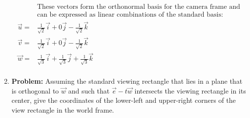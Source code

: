 \documentclass[a4paper, 12pt]{article}
\begin{document}
\begin{enumerate}
\begin{align*}
        &\text{These vectors form the orthonormal basis for the camera frame and}\\
        &\text{can be expressed as linear combinations of the standard basis:}\\
        \vec{u} =& \frac{1}{\sqrt{2}}\vec{i} + 0\vec{j} -\frac{1}{\sqrt{2}}\vec{k}\\
        \vec{v} =& \frac{1}{\sqrt{2}}\vec{i} + 0\vec{j} -\frac{1}{\sqrt{2}}\vec{k}\\
        \vec{w} =& \frac{1}{\sqrt{3}}\vec{i} + \frac{1}{\sqrt{3}}\vec{j} + \frac{1}{\sqrt{3}}\vec{k}\\
        \end{align*}

    \item \textbf{Problem:} Assuming the standard viewing rectangle that lies in a plane that is orthogonal to \(\vec{w}\) and such that \(\vec{e} - t\vec{w}\) intersects the viewing rectangle in its center, give the coordinates of the lower-left and upper-right corners of the view rectangle in the world frame.


\end{enumerate}
\end{document}
